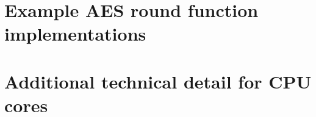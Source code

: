 \documentclass[preprint]{iacrtrans}
\begin{document}

\appendix

\clearpage
\section{Example AES round function implementations}
\label{sec:round-functions}

\clearpage
\section{Additional technical detail for CPU cores}
\label{sec:cores}


%

\end{document}

